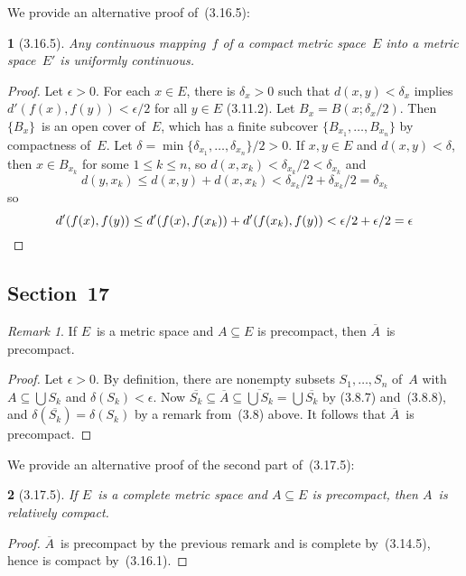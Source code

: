 \documentclass[letterpaper,12pt]{article}
\newcommand{\bigunion}{\bigcup}
\newcommand{\diam}{\delta}
\newcommand{\closure}[1]{\overline{#1}}
\theoremstyle{plain}
\newtheorem*{prop}{}
\theoremstyle{definition}
\theoremstyle{remark}
\newtheorem*{rmk}{Remark}
\begin{document}
\noindent We provide an alternative proof of~(3.16.5):
\begin{prop}[3.16.5]
Any continuous mapping~\(f\) of a compact metric space~\(E\) into a metric space~\(E'\) is uniformly continuous.
\end{prop}
\begin{proof}
Let \(\epsilon>0\). For each \(x\in E\), there is \(\delta_x>0\) such that \(d(x,y)<\delta_x\) implies \(d'(f(x),f(y))<\epsilon/2\) for all \(y\in E\) (3.11.2). Let \(B_x=B(x;\delta_x/2)\). Then \(\{B_x\}\)~is an open cover of~\(E\), which has a finite subcover \(\{B_{x_1},\ldots,B_{x_n}\}\) by compactness of~\(E\). Let \(\delta=\min\{\delta_{x_1},\ldots,\delta_{x_n}\}/2>0\). If \(x,y\in E\) and \(d(x,y)<\delta\), then \(x\in B_{x_k}\) for some \(1\le k\le n\), so \(d(x,x_k)<\delta_{x_k}/2<\delta_{x_k}\) and
\[d(y,x_k)\le d(x,y)+d(x,x_k)<\delta_{x_k}/2+\delta_{x_k}/2=\delta_{x_k}\]
so
\[d'(f(x),f(y))\le d'(f(x),f(x_k))+d'(f(x_k),f(y))<\epsilon/2+\epsilon/2=\epsilon\qedhere\]
\end{proof}

\subsection*{Section~17}
\begin{rmk}
If \(E\)~is a metric space and \(A\subseteq E\) is precompact, then \(\closure{A}\)~is precompact.
\end{rmk}
\begin{proof}
Let \(\epsilon>0\). By definition, there are nonempty subsets \(S_1,\ldots,S_n\) of~\(A\) with \(A\subseteq\bigunion S_k\) and \(\diam(S_k)<\epsilon\). Now \(\closure{S_k}\subseteq\closure{A}\subseteq\closure{\bigunion S_k}=\bigunion\closure{S_k}\) by (3.8.7) and~(3.8.8), and \(\diam(\closure{S_k})=\diam(S_k)\) by a remark from~(3.8) above. It follows that \(\closure{A}\)~is precompact.
\end{proof}

\noindent We provide an alternative proof of the second part of~(3.17.5):
\begin{prop}[3.17.5]
If \(E\)~is a complete metric space and \(A\subseteq E\) is precompact, then \(A\)~is relatively compact.
\end{prop}
\begin{proof}
\(\closure{A}\)~is precompact by the previous remark and is complete by~(3.14.5), hence is compact by~(3.16.1).
\end{proof}
\end{document}
